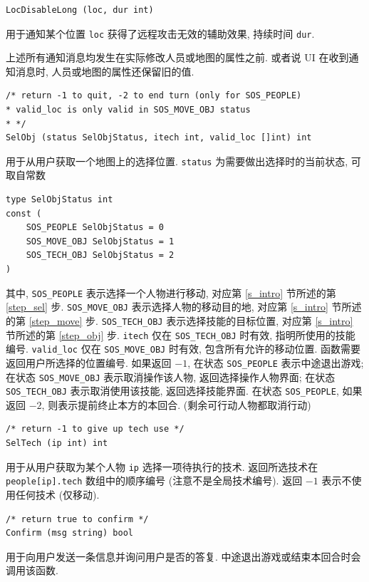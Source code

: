 \documentclass[UTF8, zihao=-4]{ctexart} %
\newcommand{\lcode}{\lstinline} % 段内插入代码
\begin{document}
\begin{lstlisting}
LocDisableLong (loc, dur int)
\end{lstlisting}
用于通知某个位置 \lcode{loc} 获得了远程攻击无效的辅助效果, 持续时间 \lcode{dur}.

上述所有通知消息均发生在实际修改人员或地图的属性之前. 或者说 UI
在收到通知消息时, 人员或地图的属性还保留旧的值.

\begin{lstlisting}
/* return -1 to quit, -2 to end turn (only for SOS_PEOPLE) 
* valid_loc is only valid in SOS_MOVE_OBJ status
* */
SelObj (status SelObjStatus, itech int, valid_loc []int) int 
\end{lstlisting}
用于从用户获取一个地图上的选择位置. \lcode{status} 为需要做出选择时的当前状态, 可取自常数  
\begin{lstlisting}
type SelObjStatus int
const (
	SOS_PEOPLE SelObjStatus = 0
	SOS_MOVE_OBJ SelObjStatus = 1
	SOS_TECH_OBJ SelObjStatus = 2
)
\end{lstlisting}
其中, \lcode{SOS_PEOPLE} 表示选择一个人物进行移动, 对应第 \ref{s_intro} 节所述的第 \ref{step_sel} 步.
\lcode{SOS_MOVE_OBJ} 表示选择人物的移动目的地, 对应第 \ref{s_intro} 节所述的第 \ref{step_move} 步. 
\lcode{SOS_TECH_OBJ} 表示选择技能的目标位置, 对应第 \ref{s_intro} 节所述的第 \ref{step_obj} 步. 
\lcode{itech} 仅在 \lcode{SOS_TECH_OBJ} 时有效, 指明所使用的技能编号.
\lcode{valid_loc} 仅在 \lcode{SOS_MOVE_OBJ} 时有效, 包含所有允许的移动位置.
函数需要返回用户所选择的位置编号. 如果返回 $-1$, 
在状态 \lcode{SOS_PEOPLE} 表示中途退出游戏;
在状态 \lcode{SOS_MOVE_OBJ} 表示取消操作该人物, 返回选择操作人物界面;
在状态 \lcode{SOS_TECH_OBJ} 表示取消使用该技能, 返回选择技能界面.
在状态 \lcode{SOS_PEOPLE}, 如果返回 $-2$, 则表示提前终止本方的本回合. (剩余可行动人物都取消行动)

\begin{lstlisting}
/* return -1 to give up tech use */
SelTech (ip int) int
\end{lstlisting}
用于从用户获取为某个人物 \lcode{ip} 选择一项待执行的技术. 
返回所选技术在 \lcode{people[ip].tech} 数组中的顺序编号 (注意不是全局技术编号).
返回 $-1$ 表示不使用任何技术 (仅移动).

\begin{lstlisting}
/* return true to confirm */
Confirm (msg string) bool 
\end{lstlisting}
用于向用户发送一条信息并询问用户是否的答复. 中途退出游戏或结束本回合时会调用该函数.
\end{document}
